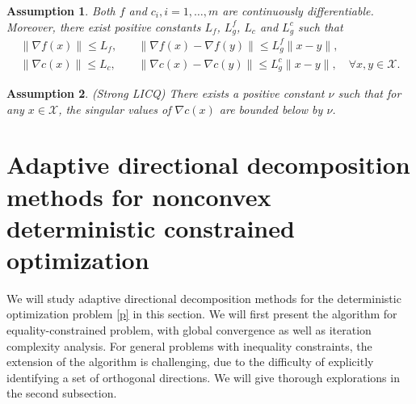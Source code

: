 \documentclass[11pt]{article}
\newtheorem{assumption}{Assumption}
\begin{document}
\begin{assumption}\label{ass:basic}
Both $f$ and $c_i, i=1,\ldots,m$ are continuously differentiable. Moreover, there exist positive constants $L_f$, $L_g^f$, $L_c$ and $L_g^c$ such that 
 \begin{align*}
\|\nabla f(x)\|\le L_f, &\quad \|\nabla f(x)-\nabla f(y)\|\le L_g^f\|x-y\|,\\
\|\nabla c(x)\|\le L_c, &\quad \|\nabla c(x)-\nabla c(y)\|\le L_g^c\|x-y\|, \quad \forall x,y \in \mathcal X.
\end{align*}
\end{assumption}

\begin{assumption}\label{ass:cq}
{\rm (Strong LICQ)} There exists a positive constant \(\nu\) such that for any $x\in\mathcal X$, the singular values of \(\nabla c(x)\) are bounded below by \(\nu\).
\end{assumption}

\section{Adaptive directional decomposition methods for nonconvex  deterministic constrained optimization}\label{sec:base-method}

We will study  adaptive directional decomposition methods for the deterministic optimization problem \eqref{p} in this section. We will first present the algorithm for equality-constrained problem, with global  convergence as well as iteration complexity analysis. {For general problems with inequality constraints, the extension of the algorithm is challenging, due to the difficulty of explicitly identifying a set of orthogonal directions.} We will give  thorough explorations in {the second} subsection.
\end{document}
